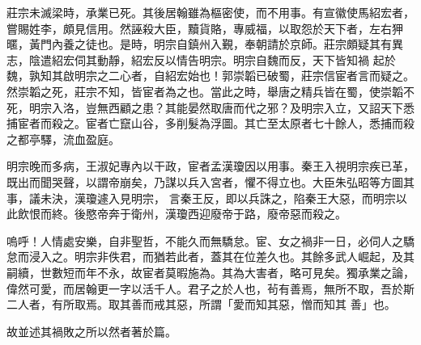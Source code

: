 \begin{pinyinscope}
 莊宗未滅梁時，承業已死。其後居翰雖為樞密使，而不用事。有宣徽使馬紹宏者，嘗賜姓李，頗見信用。然誣殺大臣，黷貨賂，專威福，以取怨於天下者，左右狎暱，黃門內養之徒也。是時，明宗自鎮州入覲，奉朝請於京師。莊宗頗疑其有異志，陰遣紹宏伺其動靜，紹宏反以情告明宗。明宗自魏而反，天下皆知禍
 起於魏，孰知其啟明宗之二心者，自紹宏始也！郭崇韜已破蜀，莊宗信宦者言而疑之。然崇韜之死，莊宗不知，皆宦者為之也。當此之時，舉唐之精兵皆在蜀，使崇韜不死，明宗入洛，豈無西顧之患？其能晏然取唐而代之邪？及明宗入立，又詔天下悉捕宦者而殺之。宦者亡竄山谷，多削髮為浮圖。其亡至太原者七十餘人，悉捕而殺之都亭驛，流血盈庭。



 明宗晚而多病，王淑妃專內以干政，宦者孟漢瓊因以用事。秦王入視明宗疾已革，既出而聞哭聲，以謂帝崩矣，乃謀以兵入宮者，懼不得立也。大臣朱弘昭等方圖其事，議未決，漢瓊遽入見明宗，
 言秦王反，即以兵誅之，陷秦王大惡，而明宗以此飲恨而終。後愍帝奔于衛州，漢瓊西迎廢帝于路，廢帝惡而殺之。



 嗚呼！人情處安樂，自非聖哲，不能久而無驕怠。宦、女之禍非一日，必伺人之驕怠而浸入之。明宗非佚君，而猶若此者，蓋其在位差久也。其餘多武人崛起，及其嗣續，世數短而年不永，故宦者莫暇施為。其為大害者，略可見矣。獨承業之論，偉然可愛，而居翰更一字以活千人。君子之於人也，茍有善焉，無所不取，吾於斯二人者，有所取焉。取其善而戒其惡，所謂「愛而知其惡，憎而知其
 善」也。



 故並述其禍敗之所以然者著於篇。



\end{pinyinscope}